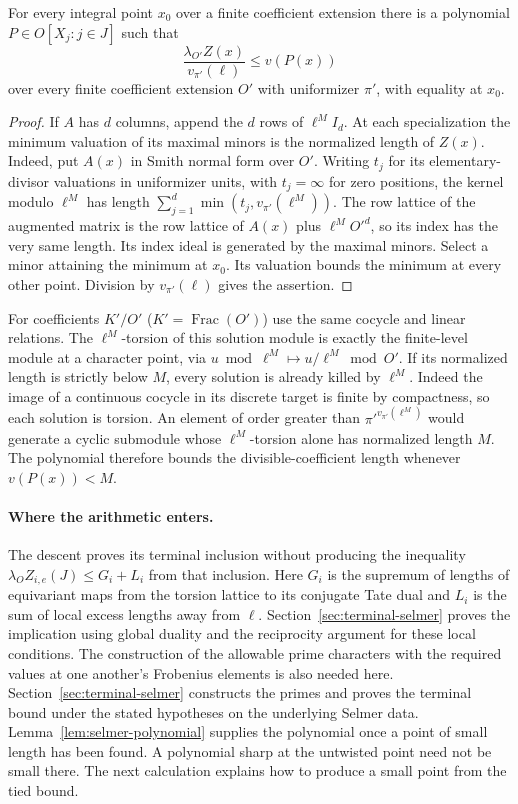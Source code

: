 \begin{lemma}\label{lem:selmer-polynomial}
For every integral point $x_0$ over a finite coefficient extension there is
a polynomial $P\in O[X_j:j\in J]$ such that
\[
 \frac{\lambda_{O'}Z(x)}{v_{\pi'}(\ell)}\leq v(P(x))
\]
over every finite coefficient extension $O'$ with uniformizer $\pi'$,
with equality at $x_0$.
\end{lemma}
\begin{proof}
If $A$ has $d$ columns, append the $d$ rows of $\ell^M I_d$.
At each specialization the minimum valuation of its maximal minors is
the normalized length of $Z(x)$. Indeed, put $A(x)$ in Smith normal
form over $O'$. Writing $t_j$ for its elementary-divisor valuations in
uniformizer units, with $t_j=\infty$ for zero positions, the kernel
modulo $\ell^M$ has length $\sum_{j=1}^d\min(t_j,v_{\pi'}(\ell^M))$.
The row lattice of the augmented matrix is the row lattice of $A(x)$
plus $\ell^M O'^d$, so its index has the very same length. Its index
ideal is generated by the maximal minors. Select a minor attaining the
minimum at $x_0$. Its valuation bounds the minimum at every other
point. Division by $v_{\pi'}(\ell)$ gives the assertion.
\end{proof}

For coefficients $K'/O'$ ($K'=\operatorname{Frac}(O')$) use the same
cocycle and linear relations. The $\ell^M$-torsion of this solution
module is exactly the finite-level module at a character point, via
$u\bmod\ell^M\mapsto u/\ell^M\bmod O'$. If its normalized length is
strictly below $M$, every solution is already killed by $\ell^M$.
Indeed the image of a continuous cocycle in its discrete target is finite
by compactness, so each solution is torsion. An element of order
greater than $\pi'^{v_{\pi'}(\ell^M)}$ would generate a cyclic
submodule whose $\ell^M$-torsion alone has normalized length $M$.
The polynomial therefore bounds the divisible-coefficient length
whenever $v(P(x))<M$.

\paragraph{Where the arithmetic enters.}
The descent proves its terminal inclusion without producing the
inequality $\lambda_O Z_{i,e}(J)\leq G_i+L_i$ from that inclusion.
Here $G_i$ is the supremum of lengths of equivariant maps from the
torsion lattice to its conjugate Tate dual and $L_i$ is the sum of
local excess lengths away from $\ell$. Section~\ref{sec:terminal-selmer} proves the implication using global duality and the reciprocity argument for these local conditions. The construction of the allowable prime characters
with the required values at one another's Frobenius elements is also
needed here. Section~\ref{sec:terminal-selmer} constructs the primes and proves the terminal bound under the stated hypotheses on the underlying Selmer data. Lemma~\ref{lem:selmer-polynomial} supplies the
polynomial once a point of small length has been found. A polynomial
sharp at the untwisted point need not be small there. The next
calculation explains how to produce a small point from the tied bound.

